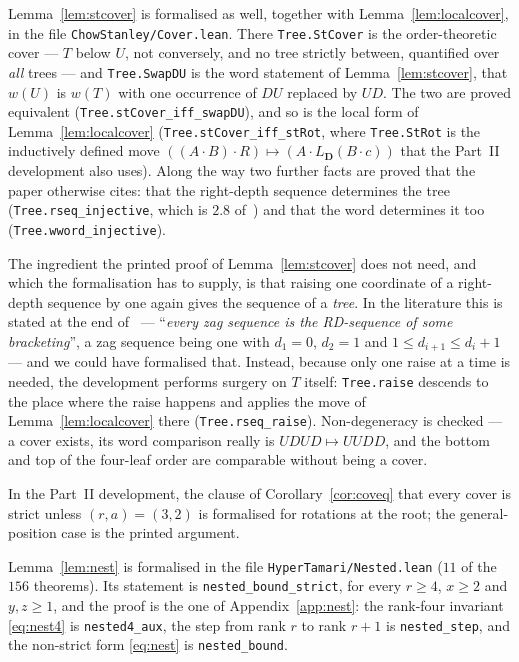 \documentclass[11pt,a4paper]{article}
\theoremstyle{plain}
\theoremstyle{definition}
\begin{document}
\begin{sloppypar}
Lemma~\ref{lem:stcover} is formalised as well, together with
Lemma~\ref{lem:localcover}, in the file \verb|ChowStanley/Cover.lean|. There
\verb|Tree.StCover| is the order-theoretic cover --- $T$ below $U$, not conversely, and
no tree strictly between, quantified over \emph{all} trees --- and \verb|Tree.SwapDU|
is the word statement of Lemma~\ref{lem:stcover}, that $w(U)$ is $w(T)$ with one
occurrence of $DU$ replaced by $UD$. The two are proved equivalent
(\verb|Tree.stCover_iff_swapDU|), and so is the local form of
Lemma~\ref{lem:localcover} (\verb|Tree.stCover_iff_stRot|, where \verb|Tree.StRot| is
the inductively defined move $((A\cdot B)\cdot R)\mapsto(A\cdot L_{\mathbf D}(B\cdot c))$
that the Part~II development also uses). Along the way two further facts are proved that
the paper otherwise cites: that the right-depth sequence determines the tree
(\verb|Tree.rseq_injective|, which is $2.8$ of~\cite{CsW}) and that the word determines
it too (\verb|Tree.wword_injective|).
\end{sloppypar}

The ingredient the printed proof of Lemma~\ref{lem:stcover} does not need, and which the
formalisation has to supply, is that raising one coordinate of a right-depth sequence by
one again gives the sequence of a \emph{tree}. In the literature this is stated at the
end of~\cite[2.8]{CsW} --- ``\emph{every zag sequence is the
RD-sequence of some bracketing}'', a zag sequence being one with $d_1=0$, $d_2=1$ and
$1\le d_{i+1}\le d_i+1$ --- and we could have formalised that. Instead, because only
one raise at a time is needed, the development performs surgery on $T$ itself:
\verb|Tree.raise| descends to the place where the raise happens and applies the move of
Lemma~\ref{lem:localcover} there (\verb|Tree.rseq_raise|). Non-degeneracy is checked ---
a cover exists, its word comparison really is $UDUD\mapsto UUDD$, and the bottom and top
of the four-leaf order are comparable without being a cover.

In the Part~II development, the clause of
Corollary~\ref{cor:coveq} that every cover is strict unless $(r,a)=(3,2)$ is formalised
for rotations at the root; the general-position case is the printed argument.

Lemma~\ref{lem:nest} is formalised in the file \verb|HyperTamari/Nested.lean| ($11$ of
the $156$ theorems). Its statement is \verb|nested_bound_strict|, for every $r\ge4$,
$x\ge2$ and $y,z\ge1$, and the proof is the one of Appendix~\ref{app:nest}: the
rank-four invariant \eqref{eq:nest4} is \verb|nested4_aux|, the step from rank $r$ to
rank $r+1$ is \verb|nested_step|, and the non-strict form \eqref{eq:nest} is
\verb|nested_bound|.
\end{document}
